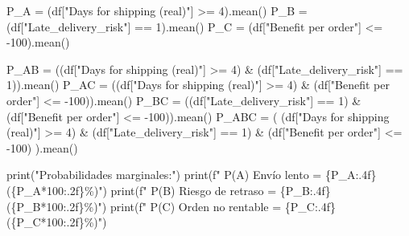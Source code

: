 \documentclass[
  letterpaper,
  DIV=11,
  numbers=noendperiod]{scrartcl}
\newenvironment{Shaded}{\begin{snugshade}}{\end{snugshade}}
\newcommand{\BuiltInTok}[1]{\textcolor[rgb]{0.00,0.23,0.31}{#1}}
\newcommand{\DecValTok}[1]{\textcolor[rgb]{0.68,0.00,0.00}{#1}}
\newcommand{\NormalTok}[1]{\textcolor[rgb]{0.00,0.23,0.31}{#1}}
\newcommand{\OperatorTok}[1]{\textcolor[rgb]{0.37,0.37,0.37}{#1}}
\newcommand{\SpecialCharTok}[1]{\textcolor[rgb]{0.37,0.37,0.37}{#1}}
\newcommand{\SpecialStringTok}[1]{\textcolor[rgb]{0.13,0.47,0.30}{#1}}
\newcommand{\StringTok}[1]{\textcolor[rgb]{0.13,0.47,0.30}{#1}}
\begin{document}
\protect{}\label{bayes-2var}
\begin{Shaded}
\begin{Highlighting}[]
\NormalTok{P\_A }\OperatorTok{=}\NormalTok{ (df[}\StringTok{"Days for shipping (real)"}\NormalTok{] }\OperatorTok{\textgreater{}=} \DecValTok{4}\NormalTok{).mean()}
\NormalTok{P\_B }\OperatorTok{=}\NormalTok{ (df[}\StringTok{"Late\_delivery\_risk"}\NormalTok{] }\OperatorTok{==} \DecValTok{1}\NormalTok{).mean()}
\NormalTok{P\_C }\OperatorTok{=}\NormalTok{ (df[}\StringTok{"Benefit per order"}\NormalTok{] }\OperatorTok{\textless{}=} \OperatorTok{{-}}\DecValTok{100}\NormalTok{).mean()}

\NormalTok{P\_AB  }\OperatorTok{=}\NormalTok{ ((df[}\StringTok{"Days for shipping (real)"}\NormalTok{] }\OperatorTok{\textgreater{}=} \DecValTok{4}\NormalTok{) }\OperatorTok{\&}\NormalTok{ (df[}\StringTok{"Late\_delivery\_risk"}\NormalTok{] }\OperatorTok{==} \DecValTok{1}\NormalTok{)).mean()}
\NormalTok{P\_AC  }\OperatorTok{=}\NormalTok{ ((df[}\StringTok{"Days for shipping (real)"}\NormalTok{] }\OperatorTok{\textgreater{}=} \DecValTok{4}\NormalTok{) }\OperatorTok{\&}\NormalTok{ (df[}\StringTok{"Benefit per order"}\NormalTok{] }\OperatorTok{\textless{}=} \OperatorTok{{-}}\DecValTok{100}\NormalTok{)).mean()}
\NormalTok{P\_BC  }\OperatorTok{=}\NormalTok{ ((df[}\StringTok{"Late\_delivery\_risk"}\NormalTok{] }\OperatorTok{==} \DecValTok{1}\NormalTok{) }\OperatorTok{\&}\NormalTok{ (df[}\StringTok{"Benefit per order"}\NormalTok{] }\OperatorTok{\textless{}=} \OperatorTok{{-}}\DecValTok{100}\NormalTok{)).mean()}
\NormalTok{P\_ABC }\OperatorTok{=}\NormalTok{ (}
\NormalTok{    (df[}\StringTok{"Days for shipping (real)"}\NormalTok{] }\OperatorTok{\textgreater{}=} \DecValTok{4}\NormalTok{) }\OperatorTok{\&}
\NormalTok{    (df[}\StringTok{"Late\_delivery\_risk"}\NormalTok{] }\OperatorTok{==} \DecValTok{1}\NormalTok{) }\OperatorTok{\&}
\NormalTok{    (df[}\StringTok{"Benefit per order"}\NormalTok{] }\OperatorTok{\textless{}=} \OperatorTok{{-}}\DecValTok{100}\NormalTok{)}
\NormalTok{).mean()}

\BuiltInTok{print}\NormalTok{(}\StringTok{"Probabilidades marginales:"}\NormalTok{)}
\BuiltInTok{print}\NormalTok{(}\SpecialStringTok{f"  P(A) Envío lento       = }\SpecialCharTok{\{}\NormalTok{P\_A}\SpecialCharTok{:.4f\}}\SpecialStringTok{  (}\SpecialCharTok{\{}\NormalTok{P\_A}\OperatorTok{*}\DecValTok{100}\SpecialCharTok{:.2f\}}\SpecialStringTok{\%)"}\NormalTok{)}
\BuiltInTok{print}\NormalTok{(}\SpecialStringTok{f"  P(B) Riesgo de retraso = }\SpecialCharTok{\{}\NormalTok{P\_B}\SpecialCharTok{:.4f\}}\SpecialStringTok{  (}\SpecialCharTok{\{}\NormalTok{P\_B}\OperatorTok{*}\DecValTok{100}\SpecialCharTok{:.2f\}}\SpecialStringTok{\%)"}\NormalTok{)}
\BuiltInTok{print}\NormalTok{(}\SpecialStringTok{f"  P(C) Orden no rentable = }\SpecialCharTok{\{}\NormalTok{P\_C}\SpecialCharTok{:.4f\}}\SpecialStringTok{  (}\SpecialCharTok{\{}\NormalTok{P\_C}\OperatorTok{*}\DecValTok{100}\SpecialCharTok{:.2f\}}\SpecialStringTok{\%)"}\NormalTok{)}


\end{Highlighting}
\end{Shaded}
\end{document}

